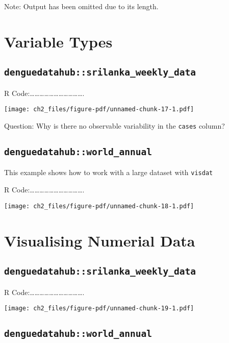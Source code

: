 \documentclass[
  letterpaper,
  DIV=11,
  numbers=noendperiod]{scrreprt}
\begin{document}
Note: Output has been omitted due to its length.

\section{Variable Types}\label{variable-types}

\subsection{\texorpdfstring{\texttt{denguedatahub::srilanka\_weekly\_data}}{denguedatahub::srilanka\_weekly\_data}}\label{denguedatahubsrilanka_weekly_data}

R
Code:\ldots\ldots\ldots\ldots\ldots\ldots\ldots\ldots\ldots\ldots\ldots.

\texttt{[image: ch2\_files/figure-pdf/unnamed-chunk-17-1.pdf]}

Question: Why is there no observable variability in the \texttt{cases}
column?

\subsection{\texorpdfstring{\texttt{denguedatahub::world\_annual}}{denguedatahub::world\_annual}}\label{denguedatahubworld_annual}

This example shows how to work with a large dataset with \texttt{visdat}

R
Code:\ldots\ldots\ldots\ldots\ldots\ldots\ldots\ldots\ldots\ldots\ldots.

\texttt{[image: ch2\_files/figure-pdf/unnamed-chunk-18-1.pdf]}

\section{Visualising Numerial Data}\label{visualising-numerial-data}

\subsection{\texorpdfstring{\texttt{denguedatahub::srilanka\_weekly\_data}}{denguedatahub::srilanka\_weekly\_data}}\label{denguedatahubsrilanka_weekly_data-1}

R
Code:\ldots\ldots\ldots\ldots\ldots\ldots\ldots\ldots\ldots\ldots\ldots.

\texttt{[image: ch2\_files/figure-pdf/unnamed-chunk-19-1.pdf]}

\subsection{\texorpdfstring{\texttt{denguedatahub::world\_annual}}{denguedatahub::world\_annual}}\label{denguedatahubworld_annual-1}
\end{document}
